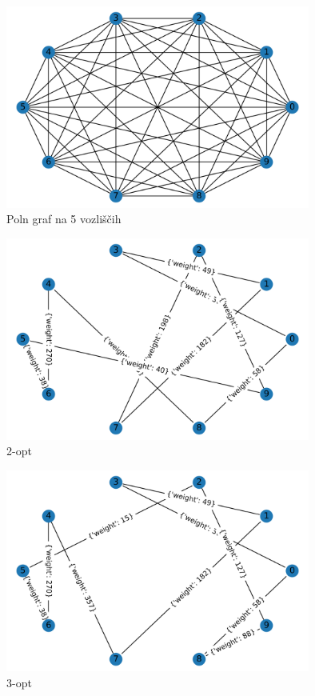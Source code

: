 \documentclass[8pt]{beamer}
\begin{document}
\begin{frame}
  \begin{figure}
  \includegraphics[width=10cm]{primeri/primer2.png}
 	\caption{Poln graf na 5 vozliščih}
	\label{Slika 5}
	\end{figure}
\end{frame}

\begin{frame}
\begin{figure}
  \includegraphics[width=10cm]{primeri/primer2_2opt.png}
\caption{2-opt}
\label{Slika 6}
\end{figure}
\end{frame}


\begin{frame}
  \begin{figure}
  \includegraphics[width=10cm]{primeri/primer2_3opt.png}
 	\caption{3-opt}
	\label{Slika 7}
	\end{figure}
\end{frame}
\end{document}
